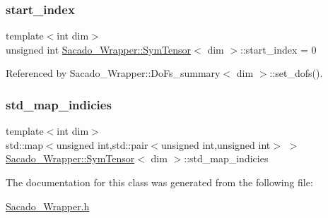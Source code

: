 \mbox{\label{classSacado__Wrapper_1_1SymTensor_afe921e6044e4110fcfc848c52844d650}} 
\subsubsection{\texorpdfstring{start\+\_\+index}{start\_index}}
{\footnotesize\ttfamily template$<$int dim$>$ \\
unsigned int \hyperlink{classSacado__Wrapper_1_1SymTensor}{Sacado\+\_\+\+Wrapper\+::\+Sym\+Tensor}$<$ dim $>$\+::start\+\_\+index = 0}



Referenced by Sacado\+\_\+\+Wrapper\+::\+Do\+Fs\+\_\+summary$<$ dim $>$\+::set\+\_\+dofs().

\mbox{\label{classSacado__Wrapper_1_1SymTensor_ae3b1c56cde3fc5c7805b618ef3d9de75}} 
\subsubsection{\texorpdfstring{std\+\_\+map\+\_\+indicies}{std\_map\_indicies}}
{\footnotesize\ttfamily template$<$int dim$>$ \\
std\+::map$<$unsigned int,std\+::pair$<$unsigned int,unsigned int$>$ $>$ \hyperlink{classSacado__Wrapper_1_1SymTensor}{Sacado\+\_\+\+Wrapper\+::\+Sym\+Tensor}$<$ dim $>$\+::std\+\_\+map\+\_\+indicies}



The documentation for this class was generated from the following file\+:\begin{DoxyCompactItemize}
\item 
\hyperlink{Sacado__Wrapper_8h}{Sacado\+\_\+\+Wrapper.\+h}\end{DoxyCompactItemize}
